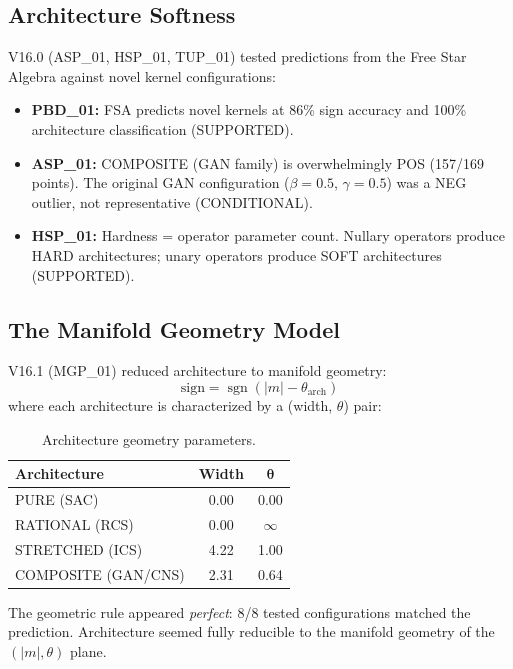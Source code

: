 \documentclass[11pt,a4paper,oneside]{report}
\newcommand{\supported}{\textcolor{supported}{SUPPORTED}}
\newcommand{\conditional}{\textcolor{conditional}{CONDITIONAL}}
\DeclareMathOperator{\sgn}{sgn}
\begin{document}
\subsection{Architecture Softness}

V16.0 (ASP\_01, HSP\_01, TUP\_01) tested predictions from the Free Star
Algebra against novel kernel configurations:
\begin{itemize}[nosep]
  \item \textbf{PBD\_01:} FSA predicts novel kernels at 86\% sign accuracy
    and 100\% architecture classification (\supported{}).
  \item \textbf{ASP\_01:} COMPOSITE (GAN family) is overwhelmingly POS
    (157/169 points). The original GAN configuration ($\beta=0.5$, $\gamma=0.5$)
    was a NEG outlier, not representative (\conditional{}).
  \item \textbf{HSP\_01:} Hardness = operator parameter count. Nullary operators
    produce HARD architectures; unary operators produce SOFT architectures
    (\supported{}).
\end{itemize}

\subsection{The Manifold Geometry Model}

V16.1 (MGP\_01) reduced architecture to manifold geometry:
\begin{equation}
  \text{sign} = \sgn(|m| - \theta_{\text{arch}})
  \label{eq:geosign}
\end{equation}
where each architecture is characterized by a (width, $\theta$) pair:

\begin{table}[h]
\centering
\caption{Architecture geometry parameters.}
\label{tab:geom}
\begin{tabular}{lcc}
\toprule
\textbf{Architecture} & \textbf{Width} & $\boldsymbol{\theta}$\\
\midrule
PURE (SAC)    & 0.00 & 0.00\\
RATIONAL (RCS)& 0.00 & $\infty$\\
STRETCHED (ICS)& 4.22 & 1.00\\
COMPOSITE (GAN/CNS)& 2.31 & 0.64\\
\bottomrule
\end{tabular}
\end{table}

The geometric rule appeared \textit{perfect}: 8/8 tested configurations
matched the prediction. Architecture seemed fully reducible to the manifold
geometry of the $(|m|, \theta)$ plane.
\end{document}
